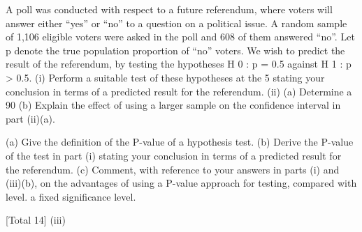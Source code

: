 A poll was conducted with respect to a future referendum, where voters will answer
either “yes” or “no” to a question on a political issue. A random sample of 1,106
eligible voters were asked in the poll and 608 of them answered “no”. Let p denote
the true population proportion of “no” voters.
We wish to predict the result of the referendum, by testing the hypotheses
H 0 : p = 0.5 against H 1 : p > 0.5.
(i) Perform a suitable test of these hypotheses at the 5%
stating your conclusion in terms of a predicted result for the referendum.  
(ii) (a) Determine a 90%
(b) Explain the effect of using a larger sample on the confidence interval in
part (ii)(a). 

(a) Give the definition of the P-value of a hypothesis test.
(b) Derive the P-value of the test in part (i) stating your conclusion in
terms of a predicted result for the referendum.
(c) Comment, with reference to your answers in parts (i) and (iii)(b), on
the advantages of using a P-value approach for testing, compared with
level.
a fixed significance level.

[Total 14]
(iii)


